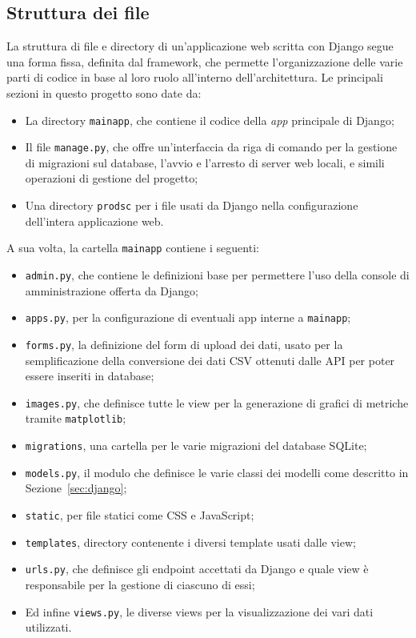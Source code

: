 \subsection{Struttura dei file}


La struttura di file e directory di un'applicazione web scritta con Django 
segue una forma fissa, definita dal framework, che permette l'organizzazione
delle varie parti di codice in base al loro ruolo all'interno dell'architettura.
Le principali sezioni in questo progetto sono date da:
\begin{itemize}
  \item La directory \texttt{mainapp}, che contiene il codice della \textit{app}
        principale di Django;
  \item Il file \texttt{manage.py}, che offre un'interfaccia da riga di comando
        per la gestione di migrazioni sul database, l'avvio e l'arresto di server
        web locali, e simili operazioni di gestione del progetto;
  \item Una directory \texttt{prodsc} per i file usati da Django nella configurazione
        dell'intera applicazione web.
\end{itemize}

A sua volta, la cartella \texttt{mainapp} contiene i seguenti:
\begin{itemize}
  \item \texttt{admin.py}, che contiene le definizioni base per permettere l'uso
        della console di amministrazione offerta da Django;
  \item \texttt{apps.py}, per la configurazione di eventuali app interne a \texttt{mainapp};
  \item \texttt{forms.py}, la definizione del form di upload dei dati, usato per la
        semplificazione della conversione dei dati CSV ottenuti dalle API per
        poter essere inseriti in database;
  \item \texttt{images.py}, che definisce tutte le view per la generazione di
        grafici di metriche tramite \texttt{matplotlib};
  \item \texttt{migrations}, una cartella per le varie migrazioni del database SQLite;
  \item \texttt{models.py}, il modulo che definisce le varie classi dei modelli
        come descritto in Sezione~\ref{sec:django};
  \item \texttt{static}, per file statici come CSS e JavaScript;
  \item \texttt{templates}, directory contenente i diversi template usati dalle view;
  \item \texttt{urls.py}, che definisce gli endpoint accettati da Django e quale
        view è responsabile per la gestione di ciascuno di essi;
  \item Ed infine \texttt{views.py}, le diverse views per la visualizzazione
        dei vari dati utilizzati.
\end{itemize}




